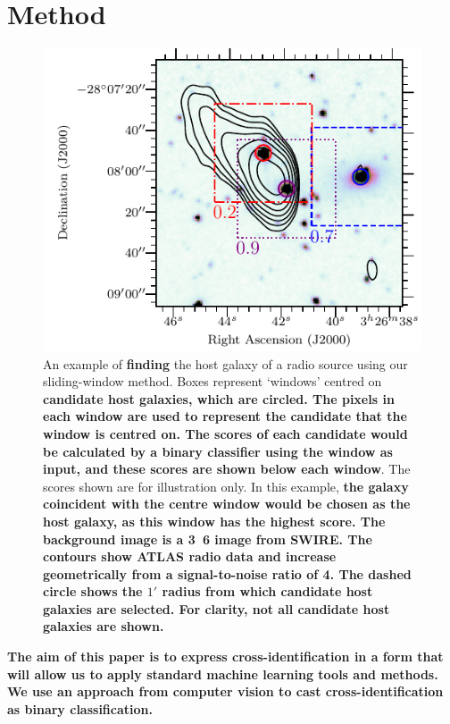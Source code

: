 \documentclass[fleqn,usenatbib,usedcolumn]{mnras}
\newcommand{\edited}[1]{{\bf {#1}}}
\begin{document}
  \section{Method}\label{sec:method}
    \begin{figure}
      \centering
      \includegraphics[width=\columnwidth]{images/figure_example_of_method.pdf}
      \caption{An example of \edited{finding} the host galaxy of a radio source using
        our sliding-window method. Boxes represent `windows'
        centred on \edited{candidate host galaxies, which are circled. The pixels in each window are used to represent the candidate that the window is centred
        on. The scores of each candidate would be calculated by a binary classifier using the window as input,
        and these scores are shown below each window}. The scores
        shown are for illustration only. In this example,
        \edited{the galaxy coincident with the centre window would be chosen as the host galaxy, as this
        window has the highest score. The background image is a \unit{3.6}{\micro\meter} image from SWIRE.
        The contours show ATLAS radio data and increase geometrically from a signal-to-noise ratio of 4. The dashed circle
        shows the $1'$ radius from which candidate host galaxies are selected. For clarity, not all candidate host galaxies are shown.}}
      \label{fig:windows}
    \end{figure}

  \edited{The aim of this paper is to express cross-identification in a form that
  will allow us to apply standard machine learning tools and methods. We use an approach from computer vision
  to cast cross-identification as binary classification.}
\end{document}
